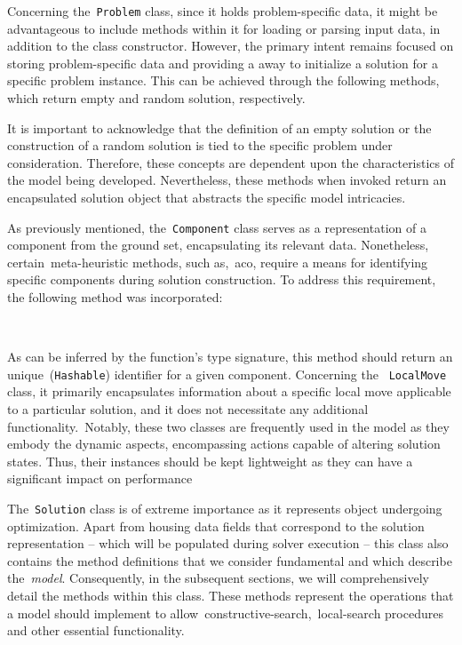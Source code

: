 Concerning the~\texttt{Problem} class, since it holds problem-specific data, it
might be advantageous to include methods within it for loading or parsing input
data, in addition to the class constructor. However, the primary intent remains
focused on storing problem-specific data and providing a away to initialize a
solution for a specific problem instance. This can be achieved through the
following methods, which return empty and random solution, respectively.

\begin{center}

\end{center}

It is important to acknowledge that the definition of an empty solution or the
construction of a random solution is tied to the specific problem under
consideration. Therefore, these concepts are dependent upon the characteristics
of the model being developed. Nevertheless, these methods when invoked return an
encapsulated solution object that abstracts the specific model intricacies.

As previously mentioned, the~\texttt{Component} class serves as a representation
of a component from the ground set, encapsulating its relevant data.
Nonetheless, certain~\acrshort{meta-heuristic} methods, such as,~\acrshort{aco},
require a means for identifying specific components during solution
construction. To address this requirement, the following method was
incorporated:

\begin{center}
  \\
\end{center}

As can be inferred by the function's type signature, this method should return
an unique~(\texttt{Hashable}) identifier for a given component. Concerning the
~\texttt{LocalMove} class, it primarily encapsulates information about a
specific local move applicable to a particular solution, and it does not
necessitate any additional functionality.~Notably, these two classes are
frequently used in the model as they embody the dynamic aspects, encompassing
actions capable of altering solution states. Thus, their instances should be
kept lightweight as they can have a significant impact on performance

The~\texttt{Solution} class is of extreme importance as it represents object
undergoing optimization. Apart from housing data fields that correspond to the
solution representation -- which will be populated during solver execution --
this class also contains the method definitions that we consider fundamental and
which describe the~\emph{model}. Consequently, in the subsequent sections, we
will comprehensively detail the methods within this class. These methods
represent the operations that a model should implement to
allow~\acrshort{constructive-search},~\acrshort{local-search} procedures and
other essential functionality.

